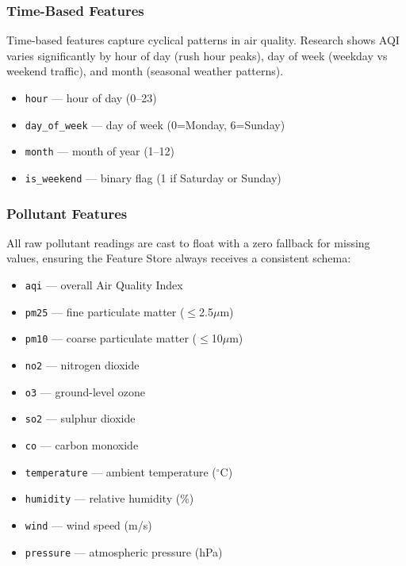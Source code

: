 \documentclass[conference]{IEEEtran}
\begin{document}
\subsubsection{Time-Based Features}
Time-based features capture cyclical patterns in air quality. Research shows AQI varies significantly by hour of day (rush hour peaks), day of week (weekday vs weekend traffic), and month (seasonal weather patterns).

\begin{itemize}[leftmargin=1.5em, itemsep=2pt]
    \item \texttt{hour} — hour of day (0--23)
    \item \texttt{day\_of\_week} — day of week (0=Monday, 6=Sunday)
    \item \texttt{month} — month of year (1--12)
    \item \texttt{is\_weekend} — binary flag (1 if Saturday or Sunday)
\end{itemize}

\subsubsection{Pollutant Features}
All raw pollutant readings are cast to float with a zero fallback for missing values, ensuring the Feature Store always receives a consistent schema:

\begin{itemize}[leftmargin=1.5em, itemsep=2pt]
    \item \texttt{aqi} — overall Air Quality Index
    \item \texttt{pm25} — fine particulate matter ($\leq$2.5$\mu$m)
    \item \texttt{pm10} — coarse particulate matter ($\leq$10$\mu$m)
    \item \texttt{no2} — nitrogen dioxide
    \item \texttt{o3} — ground-level ozone
    \item \texttt{so2} — sulphur dioxide
    \item \texttt{co} — carbon monoxide
    \item \texttt{temperature} — ambient temperature ($^\circ$C)
    \item \texttt{humidity} — relative humidity (\%)
    \item \texttt{wind} — wind speed (m/s)
    \item \texttt{pressure} — atmospheric pressure (hPa)
\end{itemize}
\end{document}
